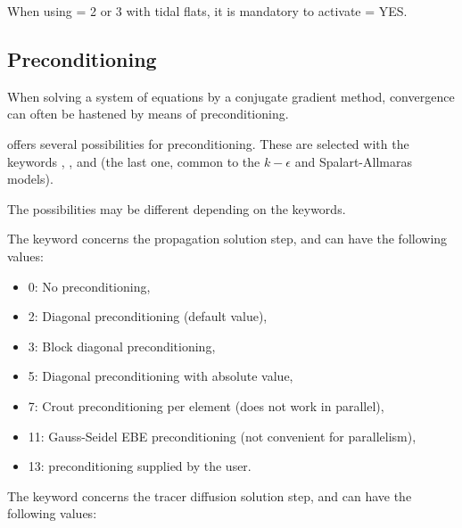 When using  = 2 or 3 with tidal flats,
it is mandatory to activate  = YES.


\subsection{Preconditioning}

When solving a system of equations by a conjugate gradient method,
convergence can often be hastened by means of preconditioning.

 offers several possibilities for preconditioning.
These are selected with the keywords ,
,
and 
(the last one, common to the $k-\epsilon$ and Spalart-Allmaras models).

The possibilities may be different depending on the keywords.

The keyword  concerns the propagation solution step,
and can have the following values:

\begin{itemize}
\item 0: No preconditioning,

\item 2: Diagonal preconditioning (default value),

\item 3: Block diagonal preconditioning,

\item 5: Diagonal preconditioning with absolute value,

\item 7: Crout preconditioning per element (does not work in parallel),

\item 11: Gauss-Seidel EBE preconditioning
(not convenient for parallelism),

\item 13: preconditioning supplied by the user.
\end{itemize}

The keyword 
concerns the tracer diffusion solution step, and can have the following values:

